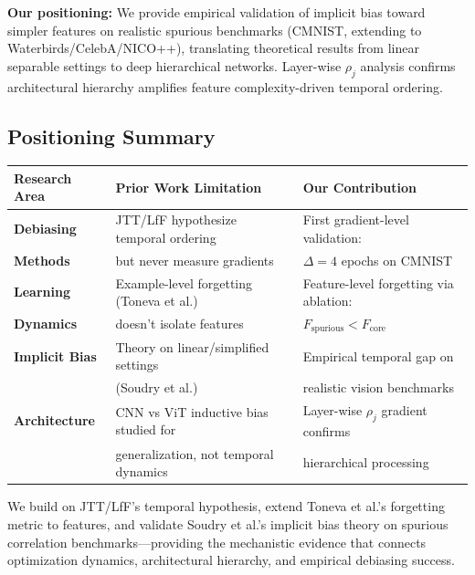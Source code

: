 \textbf{Our positioning:} We provide empirical validation of implicit bias toward simpler features on realistic spurious benchmarks (CMNIST, extending to Waterbirds/CelebA/NICO++), translating theoretical results from linear separable settings to deep hierarchical networks. Layer-wise $\rho_j$ analysis confirms architectural hierarchy amplifies feature complexity-driven temporal ordering.

\subsection{Positioning Summary}

\begin{table}[h]
\centering
\small
\begin{tabular}{lll}
\toprule
\textbf{Research Area} & \textbf{Prior Work Limitation} & \textbf{Our Contribution} \\
\midrule
\textbf{Debiasing} & JTT/LfF hypothesize temporal ordering & First gradient-level validation: \\
\textbf{Methods} & but never measure gradients & $\Delta=4$ epochs on CMNIST \\
\midrule
\textbf{Learning} & Example-level forgetting (Toneva et al.) & Feature-level forgetting via ablation: \\
\textbf{Dynamics} & doesn't isolate features & $F_{\text{spurious}} < F_{\text{core}}$ \\
\midrule
\textbf{Implicit Bias} & Theory on linear/simplified settings & Empirical temporal gap on \\
 & (Soudry et al.) & realistic vision benchmarks \\
\midrule
\textbf{Architecture} & CNN vs ViT inductive bias studied for & Layer-wise $\rho_j$ gradient confirms \\
 & generalization, not temporal dynamics & hierarchical processing \\
\bottomrule
\end{tabular}
\end{table}

We build on JTT/LfF's temporal hypothesis, extend Toneva et al.'s forgetting metric to features, and validate Soudry et al.'s implicit bias theory on spurious correlation benchmarks---providing the mechanistic evidence that connects optimization dynamics, architectural hierarchy, and empirical debiasing success.
